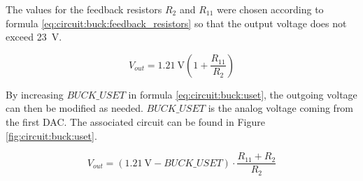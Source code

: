 \begin{minipage}{.4\textwidth}
    The  values for  the feedback  resistors  $R_2$ and  $R_{11}$ were  chosen
    according to formula  \ref{eq:circuit:buck:feedback_resistors} so that the
    output voltage does not exceed \SI{23}{\volt}.
\end{minipage}
\begin{minipage}{.6\textwidth}
    \begin{equation}
        V_{out} = \SI{1.21}{\volt} \left( 1 + \frac{R_{11}}{R_2} \right)
        \label{eq:circuit:buck:feedback_resistors}
    \end{equation}
\end{minipage}

\begin{minipage}{.40\textwidth}
    By  increasing  $BUCK\_USET$  in formula  \ref{eq:circuit:buck:uset},  the
    outgoing  voltage can  then be  modified as  needed.  $BUCK\_USET$  is the
    analog voltage  coming from the  first DAC. The associated circuit  can be
    found in Figure \ref{fig:circuit:buck:uset}.
\end{minipage}
\begin{minipage}{.60\textwidth}
    \begin{equation}
        V_{out} = (\SI{1.21}{\volt} - BUCK\_USET) \cdot \frac{R_{11} + R_2}{R_2}
        \label{eq:circuit:buck:uset}
    \end{equation}
\end{minipage}


